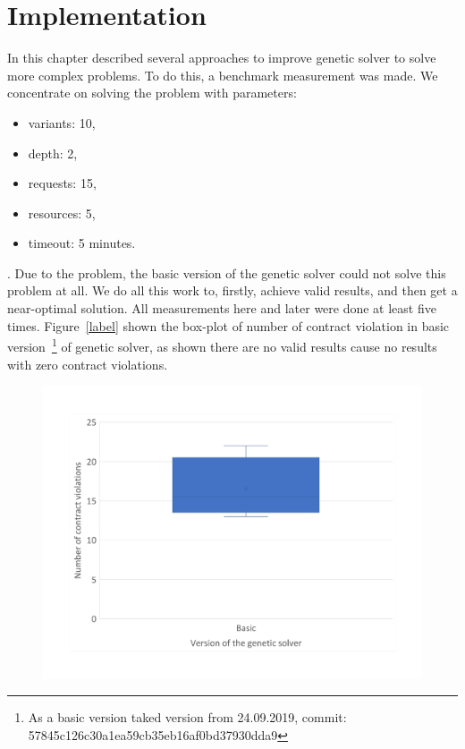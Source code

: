 \chapter{Implementation}
In this chapter described several approaches to improve genetic solver to solve more complex problems.
To do this, a benchmark measurement was made.
We concentrate on solving the problem with parameters:
\begin{itemize}
	\item variants: 10,
	\item depth: 2,
	\item requests: 15,
	\item resources: 5,
	\item timeout: 5 minutes.
\end{itemize}.
Due to the problem, the basic version of the genetic solver could not solve this problem at all. We do all this work to, firstly, achieve valid results, and then get a near-optimal solution. 
All measurements here and later were done at least five times. 
Figure~\ref{label} shown the box-plot of number of contract violation in basic version~\footnote{As a basic version taked version from 24.09.2019, commit: 57845c126c30a1ea59cb35eb16af0bd37930dda9} of genetic solver, as shown there are no valid results cause no results with zero contract violations.

\begin{figure}
	\centering
	\includegraphics[width=\textwidth]{images/BoxPlotSolverBasic}
	\caption[Boxplot with a number of contract violations for the basic version of genetic solver]{}
	\label{fig:boxplotsolverbasic}
\end{figure}


